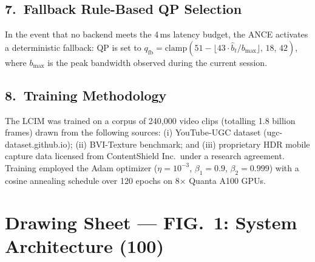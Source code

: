 \documentclass[12pt,letterpaper]{article}
\newcommand{\refnum}[1]{\textbf{(#1)}}
\begin{document}
\subsection{7.~Fallback Rule-Based QP Selection}\label{sec:fallback}

In the event that no backend meets the 4\,ms latency budget, the ANCE activates a
deterministic fallback: QP is set to $q_{\text{fb}} = \text{clamp}(51 -
\lfloor 43 \cdot \hat{b}_t / b_{\max} \rfloor,\, 18,\, 42)$, where
$b_{\max}$ is the peak bandwidth observed during the current session.

\subsection{8.~Training Methodology}

The LCIM was trained on a corpus of 240,000 video clips (totalling 1.8 billion frames)
drawn from the following sources: (i) YouTube-UGC dataset (ugc-dataset.github.io);
(ii) BVI-Texture benchmark; and (iii) proprietary HDR mobile capture data licensed
from ContentShield Inc.\ under a research agreement. Training employed the Adam
optimizer ($\eta = 10^{-3}$, $\beta_1 = 0.9$, $\beta_2 = 0.999$) with a cosine
annealing schedule over 120 epochs on 8$\times$ Quanta A100 GPUs.

\newpage
\section*{\centering Drawing Sheet — FIG.\ 1: System Architecture \refnum{100}}
\end{document}
